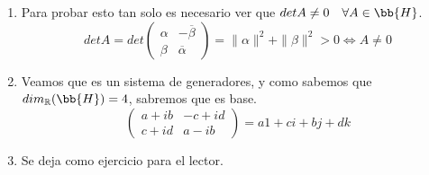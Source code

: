 \begin{ejercicio}
\begin{enumerate}
            Ahora debemos ver que $Z(\bb{H}) = \mathbb{R}$. Está claro que:
            \begin{equation*}
                \{\lm I : \lm \in \mathbb{R}\} \subset Z(\bb{H})
            \end{equation*}
            Falta ahora ver la otra inclusión. Sean $A, B \in \bb{H}$:
            \begin{gather*}
                A = \left(\begin{array}{cc}
                    \alpha  & -\overline{\beta} \\
                    \beta  & \overline{\alpha} 
                \end{array}\right) \\
                B = \left(\begin{array}{cc}
                    i & 0 \\
                    0 & -i  
                \end{array}\right)
            \end{gather*}
            Si hacemos $AB = BA$, sacamos en conclusión que $\beta = 0$. Ahora tomamos $A, C \in \bb{H}$:
            \begin{equation*}
                C = \left(\begin{array}{cc}
                    0 & i  \\
                    i  & 0 
                \end{array}\right)
            \end{equation*}
            Si forzamos $AC = CA$ tenemos que $\alpha = \overline{\alpha}$ por lo que sacamos que $A = \lm I$. 

            Por tanto $\{\lm I : \lm \in \mathbb{R}\} = Z(\bb{H})$. 
        \item Para probar esto tan solo es necesario ver que $detA \neq 0 \quad \forall A \in \bb{H}$. 
            \begin{equation*}
                detA = det \left(\begin{array}{cc}
                    \alpha  & -\overline{\beta} \\
                    \beta  & \overline{\alpha} 
                \end{array}\right)= \|\alpha\|^2 + \|\beta\|^2 > 0 \Longleftrightarrow A \neq 0
            \end{equation*}
        \item Veamos que es un sistema de generadores, y como sabemos que $dim_\mathbb{R}(\bb{H}) = 4$, sabremos que es base. 
            \begin{equation*}
                \left(\begin{array}{cc}
                    a + ib & -c + id  \\
                    c + id  & a-ib 
                \end{array}\right) = a1 + ci + bj +dk
            \end{equation*} 
        \item Se deja como ejercicio para el lector. 
    \end{enumerate}
    
\end{ejercicio}

